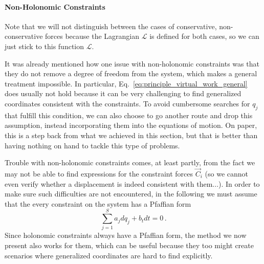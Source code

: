\documentclass[../class_mech_main.tex]{subfiles}
\begin{document}
			\paragraph{Non-Holonomic Constraints}
Note that we will not distinguish between the cases of conservative, non-conservative forces because the Lagrangian $\mathcal{L}$ is defined for both cases, so we can just stick to this function $\mathcal{L}$.


It was already mentioned how one issue with non-holonomic constraints was that they do not remove a degree of freedom from the system, which makes a general treatment impossible. In particular, Eq.~\eqref{eq:principle_virtual_work_general} does usually not hold because it can be very challenging to find generalized coordinates consistent with the constraints. To avoid cumbersome searches for $q_j$ that fulfill this condition, we can also choose to go another route and drop this assumption, instead incorporating them into the equations of motion. On paper, this is a step back from what we achieved in this section, but that is better than having nothing on hand to tackle this type of problems.

Trouble with non-holonomic constraints comes, at least partly, from the fact we may not be able to find expressions for the constraint forces $\vec{C}_i$ (so we cannot even verify whether a displacement is indeed consistent with them...). In order to make sure such difficulties are not encountered, in the following we must assume that the every constraint on the system has a Pfaffian form
\begin{equation*}
	\sum_{j = 1}^S a_j dq_j + b_t dt = 0
	\, .
\end{equation*}
Since holonomic constraints always have a Pfaffian form, the method we now present also works for them, which can be useful because they too might create scenarios where generalized coordinates are hard to find explicitly.
\end{document}
